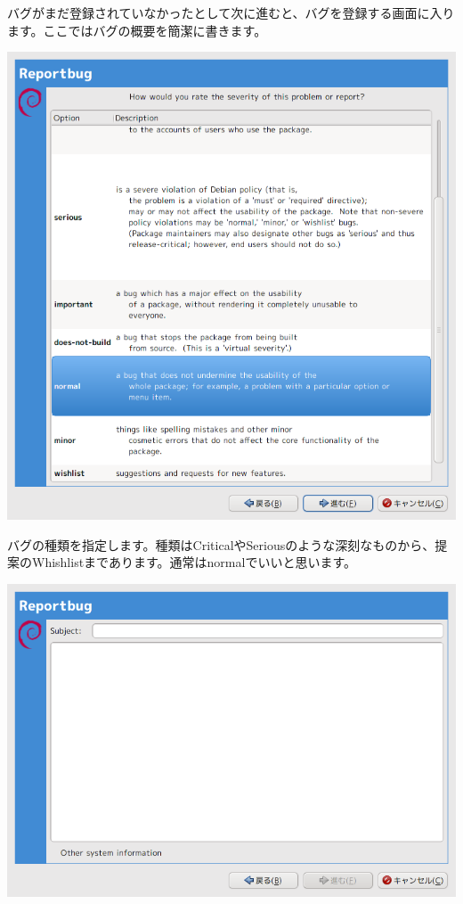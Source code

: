 \documentclass[mingoth,a4paper]{jsarticle}
\begin{document}
バグがまだ登録されていなかったとして次に進むと、バグを登録する画面に入り
ます。ここではバグの概要を簡潔に書きます。

\includegraphics[scale=0.5]{image200909/reportbug-5.png}

バグの種類を指定します。種類はCriticalやSeriousのような深刻なものから、提
案のWhishlistまであります。通常はnormalでいいと思います。

\includegraphics[scale=0.5]{image200909/reportbug-6.png}
\end{document}
